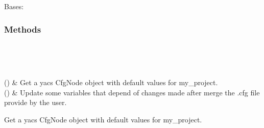 \documentclass[letterpaper,10pt,english]{sphinxmanual}
\begin{document}
\begin{fulllineitems}
\label{\detokenize{config/config:config.config.Config}}
Bases: 
\subsubsection*{Methods}


\begin{savenotes}\sphinxatlongtablestart\begin{longtable}[c]{}
\hline

\endfirsthead

%
{}\\
\hline

\endhead

\hline
{}\\
\endfoot

\endlastfoot

{\hyperref[\detokenize{config/config:config.config.Config.get_cfg_defaults}]{}}()
&
Get a yacs CfgNode object with default values for my\_project.
\\
\hline
{\hyperref[\detokenize{config/config:config.config.Config.update_dependencies}]{}}()
&
Update some variables that depend of changes made after merge the .cfg file provide by the user.
\\
\hline
\end{longtable}\sphinxatlongtableend\end{savenotes}

\begin{fulllineitems}
\label{\detokenize{config/config:config.config.Config.get_cfg_defaults}}
Get a yacs CfgNode object with default values for my\_project.

\end{fulllineitems}


\end{fulllineitems}
\end{document}
